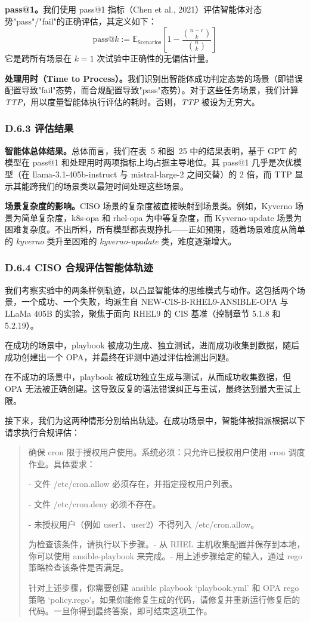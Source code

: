 \textbf{pass@1。}我们使用 pass@1 指标（Chen et al., 2021）评估智能体对态势"pass"/"fail"的正确评估，其定义如下：
\[
\mathrm{pass@}k := \mathbb{E}_{\text{Scenarios}}\left[1 - \frac{\binom{n-c}{k}}{\binom{n}{k}}\right]
\]
它是跨所有场景在 $k=1$ 次试验中正确性的无偏估计量。

\textbf{处理用时（Time to Process）。}我们识别出智能体成功判定态势的场景（即错误配置导致"fail"态势，而合规配置导致"pass"态势）。对于这些任务场景，我们计算 \textit{TTP}，用以度量智能体执行评估的耗时。否则，\textit{TTP} 被设为无穷大。

\subsubsection{D.6.3 评估结果}

\textbf{智能体总体结果。}总体而言，我们在表~5 和图~25 中的结果表明，基于 GPT 的模型在 pass@1 和处理用时两项指标上均占据主导地位。其 pass@1 几乎是次优模型（在 llama-3.1-405b-instruct 与 mistral-large-2 之间交替）的 2 倍，而 TTP 显示其能跨我们的场景类以最短时间处理这些场景。

\textbf{场景复杂度的影响。}CISO 场景的复杂度被直接映射到场景类。例如，Kyverno 场景为简单复杂度，k8s-opa 和 rhel-opa 为中等复杂度，而 Kyverno-update 场景为困难复杂度。不出所料，所有模型都表现挣扎——正如预期，随着场景难度从简单的 \textit{kyverno} 类升至困难的 \textit{kyverno-upadate} 类，难度逐渐增大。

\subsubsection{D.6.4 CISO 合规评估智能体轨迹}

我们考察实验中的两条样例轨迹，以凸显智能体的思维模式与动作。这包括两个场景，一个成功、一个失败，均派生自 NEW-CIS-B-RHEL9-ANSIBLE-OPA 与 LLaMa 405B 的实验，聚焦于面向 RHEL9 的 CIS 基准（控制章节 5.1.8 和 5.2.19）。

在成功的场景中，playbook 被成功生成、独立测试，进而成功收集到数据，随后成功创建出一个 OPA，并最终在评测中通过评估检测出问题。

在不成功的场景中，playbook 被成功独立生成与测试，从而成功收集数据，但 OPA 无法被正确创建。这导致反复的语法错误纠正与重试，最终达到最大重试上限。

接下来，我们为这两种情形分别给出轨迹。在成功场景中，智能体被指派根据以下请求执行合规评估：

\begin{quote}
确保 cron 限于授权用户使用。系统必须：只允许已授权用户使用 cron 调度作业。具体要求：

- 文件 /etc/cron.allow 必须存在，并指定授权用户列表。

- 文件 /etc/cron.deny 必须不存在。

- 未授权用户（例如 user1、user2）不得列入 /etc/cron.allow。

为检查该条件，请执行以下步骤。- 从 RHEL 主机收集配置并保存到本地，你可以使用 ansible-playbook 来完成。- 用上述步骤给定的输入，通过 rego 策略检查该条件是否满足。

针对上述步骤，你需要创建 ansible playbook `playbook.yml' 和 OPA rego 策略 `policy.rego'。如果你能修复生成的代码，请修复并重新运行修复后的代码。一旦你得到最终答案，即可结束这项工作。
\end{quote}

